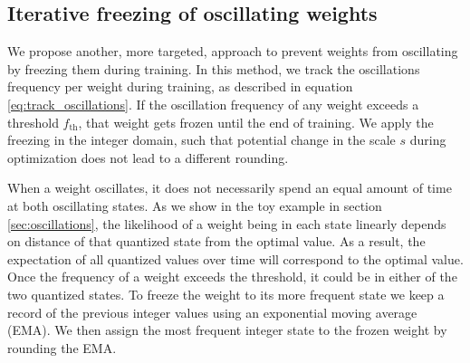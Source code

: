  
 





\subsection{Iterative freezing of oscillating weights}

\label{sec:freezing_method}
We propose another, more targeted, approach to prevent weights from oscillating by freezing them during training.
In this method, we track the oscillations frequency per weight during training, as described in equation \eqref{eq:track_oscillations}. If the oscillation frequency of any weight exceeds a threshold $f_{\text{th}}$, that weight gets frozen until the end of training. We apply the freezing in the  integer domain, such that potential change in the scale $s$ during optimization does not lead to a different rounding. 

When a weight oscillates, it does not necessarily spend an equal amount of time at both oscillating states. As we show in the toy example in section \ref{sec:oscillations}, the likelihood of a weight being in each state linearly depends on distance of that quantized state from the optimal value. As a result, the expectation of all quantized values over time will correspond to the optimal value. Once the frequency of a weight exceeds the threshold, it could be in either of the two quantized states. To freeze the weight to its more frequent state we keep a record of the previous integer values using an exponential moving average (EMA). We then assign the most frequent integer state to the frozen weight by rounding the EMA.

